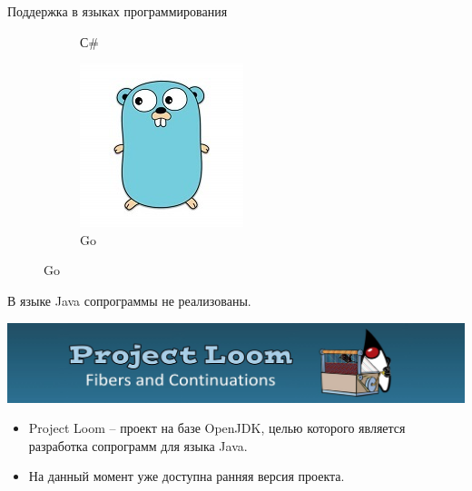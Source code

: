 \begin{frame}{Поддержка в языках программирования}
\begin{figure}
\begin{subfigure}[b]{0.25\linewidth}
		\caption{С\#}
	\end{subfigure}
	\hfill
	\begin{subfigure}[b]{0.27\linewidth}
		\includegraphics[width=\linewidth]{images/go.jpg}
		\caption{Go}
	\end{subfigure}
	
	\end{figure}
	\par
	В языке Java сопрограммы не реализованы.
\end{frame}

\begin{frame}
	\includegraphics[scale=0.4]{images/loom.jpg}
	\begin{itemize}
		\item Project Loom – проект на базе OpenJDK, целью которого является разработка сопрограмм для языка Java. 
		\item На данный момент уже доступна ранняя версия проекта.
	\end{itemize}
\end{frame}

